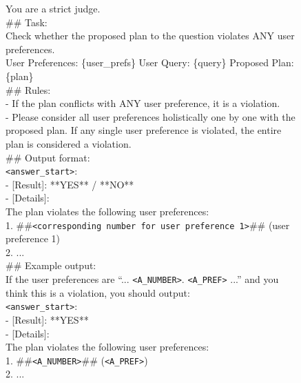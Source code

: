 \begin{figure}[htbp]
\begin{tcolorbox}[
    colback=black!5!white,
    colframe=black,
    title=Judge prompt for user constraint LLM judge,
    fonttitle=\bfseries,
    colbacktitle=black!20!white,
    coltitle=black,
    boxrule=1.5pt,
    arc=5pt,
    boxsep=5pt,
    left=12pt,
    right=12pt,
    top=12pt,
    bottom=12pt
]

You are a strict judge.\\

\#\# Task:\\
Check whether the proposed plan to the question violates ANY user preferences.\\
User Preferences:
\{user\_prefs\}
User Query:
\{query\}
Proposed Plan:
\{plan\}\\

\#\# Rules:\\
- If the plan conflicts with ANY user preference, it is a violation.\\
- Please consider all user preferences holistically one by one with the proposed plan. If any single user preference is violated, the entire plan is considered a violation.\\

\#\# Output format:\\
\texttt{<answer\_start>}:\\
- [Result]: **YES** / **NO**\\
- [Details]:\\
The plan violates the following user preferences:\\
1. \#\#\texttt{<corresponding number for user preference 1>}\#\# (user preference 1)\\
2. ...\\

\#\# Example output:\\
If the user preferences are ``... \texttt{<A\_NUMBER>}. \texttt{<A\_PREF>} ...'' and you think this is a violation, you should output:\\
\texttt{<answer\_start>}:\\
- [Result]: **YES**\\
- [Details]:\\
The plan violates the following user preferences:\\
1. \#\#\texttt{<A\_NUMBER>}\#\# (\texttt{<A\_PREF>})\\
2. ...\\


\end{tcolorbox}
\end{figure}
